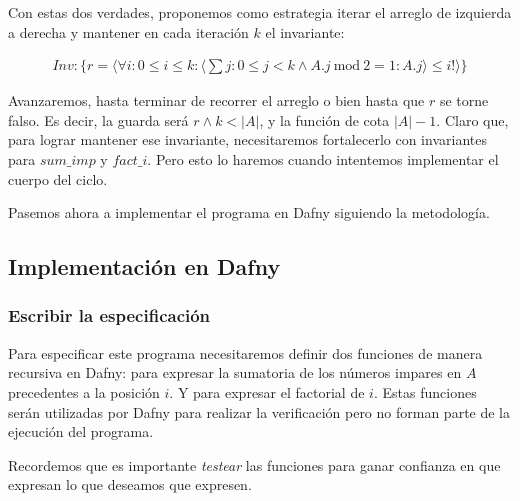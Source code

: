 \documentclass[12pt, a4paper, openany, fleqn]{book}
\begin{document}
    Con estas dos verdades, proponemos como estrategia iterar el arreglo de izquierda a derecha y mantener en cada iteración $k$ el invariante:

    \begin{align*}
        Inv: \{r = \langle\forall i : 0 \leqslant i \leqslant k : \langle\sum j : 0 \leqslant j < k \land A.j\ \text{mod}\ 2 = 1 : A.j\rangle \leqslant i! \rangle \}
    \end{align*}

    Avanzaremos, hasta terminar de recorrer el arreglo o bien hasta que $r$ se torne falso. Es decir, la guarda será $r \land k < |A|$, y la función de cota $|A| - 1$.
    Claro que, para lograr mantener ese invariante, necesitaremos fortalecerlo con invariantes para $sum\_imp$ y $fact\_i$. Pero esto lo haremos cuando intentemos implementar el cuerpo del ciclo.

    Pasemos ahora a implementar el programa en Dafny siguiendo la metodología.

    \subsection*{Implementación en Dafny}

    \subsubsection*{Escribir la especificación}
    Para especificar este programa necesitaremos definir dos funciones de manera recursiva en Dafny:  para expresar la sumatoria de los números impares en $A$ precedentes a la posición $i$. Y  para expresar el factorial de $i$. Estas funciones serán utilizadas por Dafny para realizar la verificación pero no forman parte de la ejecución del programa.

    Recordemos que es importante \textit{testear} las funciones para ganar confianza en que expresan lo que deseamos que expresen.
\end{document}

